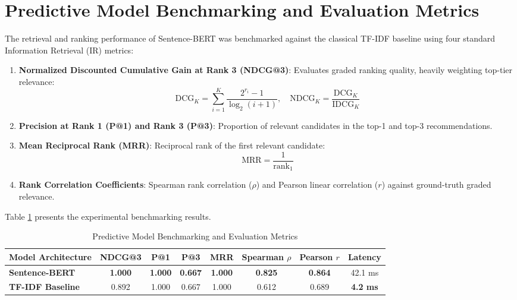 \documentclass[12pt,a4paper]{report}
\begin{document}
\section{Predictive Model Benchmarking and Evaluation Metrics}
The retrieval and ranking performance of Sentence-BERT was benchmarked against the classical TF-IDF baseline using four standard Information Retrieval (IR) metrics:
\begin{enumerate}
    \item \textbf{Normalized Discounted Cumulative Gain at Rank 3 (NDCG@3)}: Evaluates graded ranking quality, heavily weighting top-tier relevance:
    \begin{equation}
    \text{DCG}_K = \sum_{i=1}^K \frac{2^{r_i} - 1}{\log_2(i + 1)}, \quad \text{NDCG}_K = \frac{\text{DCG}_K}{\text{IDCG}_K}
    \end{equation}
    \item \textbf{Precision at Rank 1 (P@1) and Rank 3 (P@3)}: Proportion of relevant candidates in the top-1 and top-3 recommendations.
    \item \textbf{Mean Reciprocal Rank (MRR)}: Reciprocal rank of the first relevant candidate:
    \begin{equation}
    \text{MRR} = \frac{1}{\text{rank}_1}
    \end{equation}
    \item \textbf{Rank Correlation Coefficients}: Spearman rank correlation ($\rho$) and Pearson linear correlation ($r$) against ground-truth graded relevance.
\end{enumerate}

Table \ref{tab:model_benchmarking} presents the experimental benchmarking results.

\begin{table}[h!]
\centering
\caption{Predictive Model Benchmarking and Evaluation Metrics}
\label{tab:model_benchmarking}
\begin{tabular}{|l|c|c|c|c|c|c|c|}
\hline
\textbf{Model Architecture} & \textbf{NDCG@3} & \textbf{P@1} & \textbf{P@3} & \textbf{MRR} & \textbf{Spearman $\rho$} & \textbf{Pearson $r$} & \textbf{Latency} \\ \hline
\textbf{Sentence-BERT} & \textbf{1.000} & \textbf{1.000} & \textbf{0.667} & \textbf{1.000} & \textbf{0.825} & \textbf{0.864} & 42.1 ms \\ \hline
\textbf{TF-IDF Baseline} & 0.892 & 1.000 & 0.667 & 1.000 & 0.612 & 0.689 & \textbf{4.2 ms} \\ \hline
\end{tabular}
\end{table}
\end{document}
